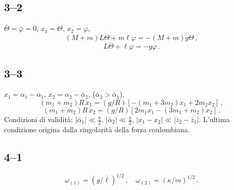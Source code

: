 \documentclass[11pt, a4paper]{book}
\numberwithin{equation}{section}
\begin{document}
\subsection*{3--2}
$\bar{\Theta} = \bar{\varphi} = 0$, $x_1 = \Theta$, $x_2 = \varphi$,
\[
    (M+m)L\ddot{\Theta} + m\ell\ddot{\varphi} = -(M+m)g\Theta \,,
\]
\[
    L\ddot{\Theta} + \ell\ddot{\varphi} = -g\varphi \,.
\]

\subsection*{3--3}
$x_1 = \alpha_1 - \bar{\alpha}_1$, $x_2 = \alpha_2 - \bar{\alpha}_2$,
($\bar{\alpha}_2 > \bar{\alpha}_1$),
\[
    (m_1+m_2)R\,\ddot{x}_1 = (g/R)\left[-(m_1+3m_2)x_1 + 2m_2 x_2\right] \,,
\]
\[
    (m_1+m_2)R\,\ddot{x}_2 = (g/R)\left[2m_1 x_1 - (3m_1+m_2)x_2\right] \,.
\]
Condizioni di validità:
$|\bar{\alpha}_1| \ll \frac{\pi}{2}$, $|\bar{\alpha}_2| \ll \frac{\pi}{2}$,
$|x_1-x_2| \ll |\bar{z}_2-\bar{z}_1|$.
L'ultima condizione origina dalla singolarità della forza coulombiana.

\subsection*{4--1}
\[
    \omega_{(1)} = (g/\bar{\ell})^{1/2}\,, \quad \omega_{(2)} = (\kappa/m)^{1/2} \,.
\]
\end{document}
